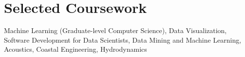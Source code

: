 \documentclass[letterpaper,11pt]{article}
\newcommand{\highp}{$^\vartriangle$}
\newcommand{\medp}{$^\circ$}
\newcommand{\lowp}{$^\triangledown$}
\begin{document}

\section{Selected Coursework}
Machine Learning (Graduate-level Computer Science), Data Visualization, Software Development for Data Scientists, Data Mining and Machine Learning, Acoustics, Coastal Engineering, Hydrodynamics

\end{document}
